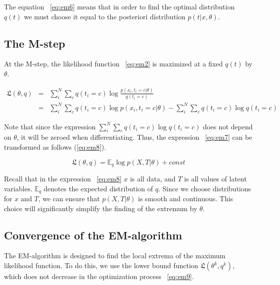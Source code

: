 \documentclass[12pt]{report}
\theoremstyle{definition}
\begin{document}
The equation ~\ref{eq:em6} means that in order to find the optimal distribution $q \left( t \right)$ we must choose it equal to the posteriori distribution $p \left( t \vert x,\theta \right)$.

\subsection{The M-step}

At the M-step, the likelihood function ~\ref {eq:em2} is maximized at a fixed $ q \left( t \right) $ by $ \theta $.

\begin{eqnarray} \label{eq:em7}
	\mathfrak{L} \left( \theta, q \right) & = &  \sum_i^N \sum_c q \left( t_i = c \right) \log \frac{p \left( x_i, t_i = c \vert \theta \right)}{q \left( t_i = c \right)} \\
	& = &  \sum_i^N \sum_c q \left( t_i = c \right) \log p \left( x_i, t_i = c \vert \theta \right) - \sum_i^N \sum_c q \left( t_i = c \right) \log {q \left( t_i = c \right)} 
\end{eqnarray}

Note that since the expression $\sum_i^N \sum_c q(t_i = c) \log {q \left( t_i = c \right) }$ does not depend on $\theta$, it will be zeroed when differentiating. 
Thus, the expression ~\ref{eq:em7} can be transformed as follows (\ref{eq:em8}).

\begin{equation} \label{eq:em8}
\mathfrak{L} \left( \theta, q \right)  = \mathbb{E}_{q}\log p \left( X,T \vert \theta \right) + const
\end{equation}

Recall that in the expression ~\ref{eq:em8} $x$ is all data, and $T$ is all values of latent variables. 
$\mathbb{E}_{q}$ denotes the expected distribution of $q$. 
Since we choose distributions for $x$ and $T$, we can ensure that $ p \left( X,T \vert \theta  \right)$ is smooth and continuous. 
This choice will significantly simplify the finding of the extremum by $\theta$.

\subsection{Convergence of the EM-algorithm}

The EM-algorithm is designed to find the local extrema of the maximum likelihood function. 
To do this, we use the lower bound function $\mathfrak{L}(\theta^k, q^k)$, which does not decrease in the optimization process ~\ref{eq:em9}.
\end{document}
